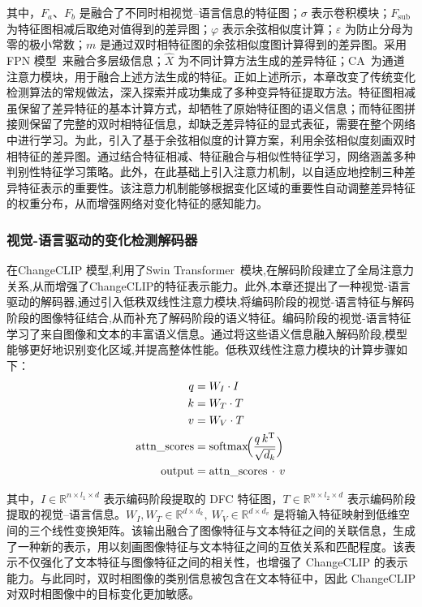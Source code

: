 其中，$F_a$、$F_b$ 是融合了不同时相视觉–语言信息的特征图；$\sigma$ 表示卷积模块；$F_{\mathrm{sub}}$ 为特征图相减后取绝对值得到的差异图；$\varphi$ 表示余弦相似度计算；$\varepsilon$ 为防止分母为零的极小常数；$m$ 是通过双时相特征图的余弦相似度图计算得到的差异图。采用 FPN 模型~\cite{lin_feature_2017}来融合多层级信息；$\hat X$ 为不同计算方法生成的差异特征；CA~\cite{Hu2017SqueezeandExcitationN}为通道注意力模块，用于融合上述方法生成的特征。正如上述所示，本章改变了传统变化检测算法的常规做法，深入探索并成功集成了多种变异特征提取方法。特征图相减虽保留了差异特征的基本计算方式，却牺牲了原始特征图的语义信息；而特征图拼接则保留了完整的双时相特征信息，却缺乏差异特征的显式表征，需要在整个网络中进行学习。为此，引入了基于余弦相似度的计算方案，利用余弦相似度刻画双时相特征的差异图。通过结合特征相减、特征融合与相似性特征学习，网络涵盖多种判别性特征学习策略。此外，在此基础上引入注意力机制，以自适应地控制三种差异特征表示的重要性。该注意力机制能够根据变化区域的重要性自动调整差异特征的权重分布，从而增强网络对变化特征的感知能力。

\subsubsection{视觉-语言驱动的变化检测解码器}

在ChangeCLIP 模型,利用了Swin Transformer~\cite{Liu2021SwinTH}模块,在解码阶段建立了全局注意力关系,从而增强了ChangeCLIP的特征表示能力。此外,本章还提出了一种视觉-语言驱动的解码器,通过引入低秩双线性注意力模块,将编码阶段的视觉-语言特征与解码阶段的图像特征结合,从而补充了解码阶段的语义特征。编码阶段的视觉-语言特征学习了来自图像和文本的丰富语义信息。通过将这些语义信息融入解码阶段,模型能够更好地识别变化区域,并提高整体性能。低秩双线性注意力模块的计算步骤如下：
\begin{align}
q &= W_I \cdot I \label{eq:changeclip-18}\\
k &= W_T \cdot T \label{eq:changeclip-19}\\
v &= W_V \cdot T \label{eq:changeclip-20}\\
\mathrm{attn\_scores} &= \mathrm{softmax}\!\Bigl(\frac{q\,k^{\mathrm{T}}}{\sqrt{d_k}}\Bigr) \label{eq:changeclip-21}\\
\mathrm{output} &= \mathrm{attn\_scores}\,\cdot\,v \label{eq:changeclip-22}
\end{align}

其中，\(I\in\mathbb{R}^{n\times l_1\times d}\) 表示编码阶段提取的 DFC 特征图，\(T\in\mathbb{R}^{n\times l_2\times d}\) 表示编码阶段提取的视觉–语言信息。\(W_I, W_T\in\mathbb{R}^{d\times d_k},\ W_V\in\mathbb{R}^{d\times d_v}\) 是将输入特征映射到低维空间的三个线性变换矩阵。该输出融合了图像特征与文本特征之间的关联信息，生成了一种新的表示，用以刻画图像特征与文本特征之间的互依关系和匹配程度。该表示不仅强化了文本特征与图像特征之间的相关性，也增强了 ChangeCLIP 的表示能力。与此同时，双时相图像的类别信息被包含在文本特征中，因此 ChangeCLIP 对双时相图像中的目标变化更加敏感。

